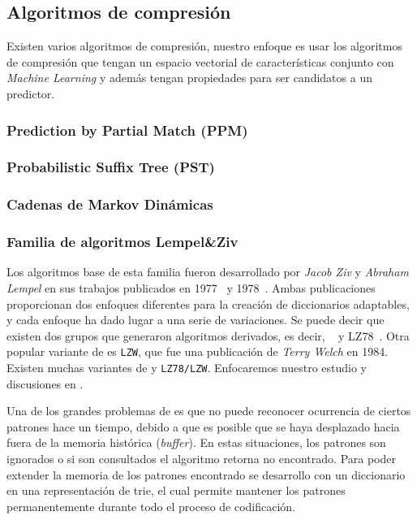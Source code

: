 \uncm
\subsection{Algoritmos de compresión}

Existen varios algoritmos de compresión, nuestro enfoque es usar los algoritmos de compresión que tengan un espacio vectorial de características conjunto con \emph{Machine Learning} y además tengan propiedades para ser candidatos a un predictor. 


\subsubsection{Prediction by Partial Match (PPM)}
	
 
\subsubsection{Probabilistic Suffix Tree (PST)}
 	

\subsubsection{Cadenas de Markov Dinámicas}
  	
 


\subsubsection{Familia de algoritmos Lempel\&Ziv}\label{ch2:sec-lzfamily}

 
Los algoritmos base de esta familia fueron desarrollado por \emph{Jacob Ziv} y \emph{Abraham Lempel} en sus trabajos publicados en 1977~\cite{ZivLempel1977} y 1978~\cite{ZivLempel1978}. Ambas publicaciones proporcionan dos enfoques diferentes para la creación de diccionarios adaptables, y cada enfoque ha dado lugar a una serie de variaciones. Se puede decir que existen dos grupos que generaron algoritmos derivados, es decir, \lzSieteSiete~\cite{ZivLempel1977} y LZ78~\cite{ZivLempel1978}. Otra popular variante  de \lzSieteOcho es \texttt{LZW}, que fue una publicación de \emph{Terry Welch} en 1984. Existen muchas variantes de \lzSieteSiete y \texttt{LZ78/LZW}. Enfocaremos nuestro estudio y discusiones en \lzSieteOcho. 


Una de los grandes problemas de \lzSieteSiete es que no puede reconocer ocurrencia de ciertos patrones hace un tiempo, debido a que es posible que se haya desplazado hacia fuera de la memoria histórica (\emph{buffer}). En estas situaciones, los patrones son ignorados o si son consultados el algoritmo retorna no encontrado. Para poder extender la memoria de los patrones encontrado se desarrollo \lzSieteOcho con un diccionario en una representación de trie, el cual permite mantener los patrones permanentemente durante todo el proceso de codificación.



